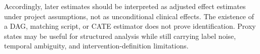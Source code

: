 Accordingly, later estimates should be interpreted as adjusted effect estimates under project assumptions, not as unconditional clinical effects.  The existence of a DAG, matching script, or CATE estimator does not prove identification.  Proxy states may be useful for structured analysis while still carrying label noise, temporal ambiguity, and intervention-definition limitations.
